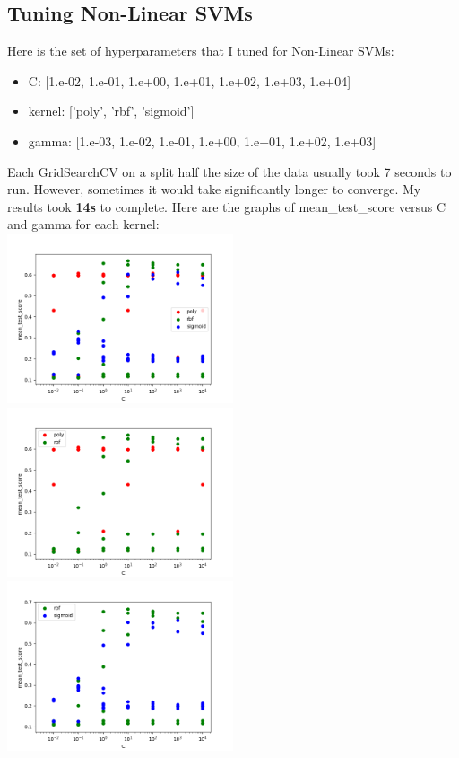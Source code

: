 \documentclass[12pt]{article}
\begin{document}
\subsection{Tuning Non-Linear SVMs}
Here is the set of hyperparameters that I tuned for Non-Linear SVMs:
\begin{itemize}
    \item C: [1.e-02, 1.e-01, 1.e+00, 1.e+01, 1.e+02, 1.e+03, 1.e+04]
    \item kernel: ['poly', 'rbf', 'sigmoid'] 
    \item gamma: [1.e-03, 1.e-02, 1.e-01, 1.e+00, 1.e+01, 1.e+02, 1.e+03]
\end{itemize}
Each GridSearchCV on a split half the size of the data usually took 7 seconds to run. However, sometimes it would take significantly longer to converge. My results took \textbf{14s} to complete. Here are the graphs of mean\_test\_score versus C and gamma for each kernel: \\
\includegraphics[width=0.5\textwidth]{SVM_C0.png}
\includegraphics[width=0.5\textwidth]{SVM_C1.png}
\includegraphics[width=0.5\textwidth]{SVM_C2.png}
\end{document}
